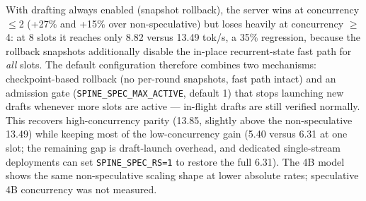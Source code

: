 \documentclass[10pt,twocolumn]{article}
\begin{document}
With drafting always enabled (snapshot rollback), the server wins at concurrency $\leq$2 (+27\% and +15\% over non-speculative) but loses heavily at concurrency $\geq$4: at 8 slots it reaches only 8.82 versus 13.49 tok/s, a 35\% regression, because the rollback snapshots additionally disable the in-place recurrent-state fast path for \emph{all} slots. The default configuration therefore combines two mechanisms: checkpoint-based rollback (no per-round snapshots, fast path intact) and an admission gate (\texttt{SPINE\_SPEC\_MAX\_ACTIVE}, default 1) that stops launching new drafts whenever more slots are active --- in-flight drafts are still verified normally. This recovers high-concurrency parity (13.85, slightly above the non-speculative 13.49) while keeping most of the low-concurrency gain (5.40 versus 6.31 at one slot; the remaining gap is draft-launch overhead, and dedicated single-stream deployments can set \texttt{SPINE\_SPEC\_RS=1} to restore the full 6.31). The 4B model shows the same non-speculative scaling shape at lower absolute rates; speculative 4B concurrency was not measured.

\begin{table}[t]
\centering
\caption{Aggregate decode throughput (tok/s) vs.\ concurrent slots, 2B.}
\label{tab:conc}
\end{table}
\end{document}
